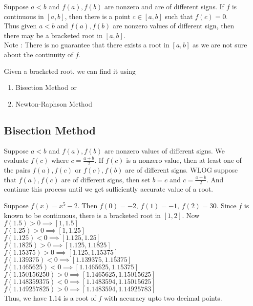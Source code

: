 \begin{remark}
	Suppose $a <  b$ and $f(a), f(b)$ are nonzero and are of different signs. If $f$ is continuous in $[a,b]$, then there is a point $c \in [a,b]$ such that $f(c) = 0$.\\
	
	Thus given $a<b$ and $f(a),f(b)$ are nonzero values of different sign, then there may be a bracketed root in $[a,b]$.\\
	
	Note : There is no guarantee that there exists a root in $[a,b]$ as we are not sure about the continuity of $f$.
\end{remark}

\begin{remark}
	Given a bracketed root, we can find it using
	\begin{enumerate}
		\item Bisection Method or
		\item Newton-Raphson Method
	\end{enumerate}
\end{remark}

\subsection{Bisection Method}
	Suppose $a < b$ and $f(a),f(b)$ are nonzero values of different signs. We evaluate $f(c)$ where $c = \frac{a+b}{2}$. If $f(c)$ is a nonzero value, then at least one of the pairs $f(a),f(c)$ or $f(c),f(b)$ are of different signs. WLOG suppose that $f(a),f(c)$ are of different signs, then set $b = c$ and $c = \frac{a+b}{2}$. And continue this process until we get sufficiently accurate value of a root.

\begin{remark}
	Suppose $f(x) = x^5 - 2$. Then $f(0) = -2,\ f(1) = -1,\ f(2) = 30$. Since $f$ is known to be continuous, there is a bracketed root in $[1,2]$. Now $f(1.5) > 0 \implies [1,1.5]$\\
	$f(1.25) > 0 \implies [1,1.25]$\\
	$f(1.125) < 0 \implies [1.125,1.25]$\\
	$f(1.1825)>0 \implies [1.125,1.1825]$\\
	$f(1.15375)>0 \implies [1.125,1.15375]$\\
	$f(1.139375) < 0 \implies [1.139375,1.15375]$\\
	$f(1.1465625) < 0 \implies [1.1465625,1.15375]$\\
	$f(1.150156250) > 0 \implies [1.1465625,1.15015625]$\\
	$f(1.148359375) < 0 \implies [1.1483594,1.15015625]$\\
	$f(1.149257825) > 0 \implies [1.1483594,1.14925783]$\\
	
	Thus, we have $1.14$ is a root of $f$ with accuracy upto two decimal points.
\end{remark}

